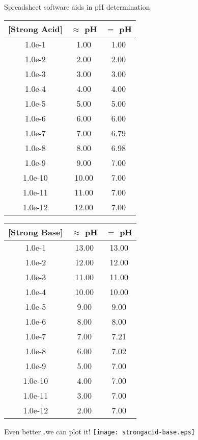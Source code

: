 \documentclass[11pt,letterpaper]{article}
\begin{document}
\begin{frame}{Spreadsheet software aids in pH determination}
	\begin{center}
		\begin{tabular} {S[table-format=1.1e-2] *{2}{S[table-format=2.2]}}
			{[Strong Acid]} & {$\approx$ pH} & {$=$ pH} \\ \midrule
			1.0e-1 & 1.00 & 1.00 \\
			1.0e-2 & 2.00 & 2.00 \\
			1.0e-3 & 3.00 & 3.00 \\
			1.0e-4 & 4.00 & 4.00 \\
			1.0e-5 & 5.00 & 5.00 \\
			1.0e-6 & 6.00 & 6.00 \\
			1.0e-7 & 7.00 & 6.79 \\
			1.0e-8 & 8.00 & 6.98 \\
			1.0e-9 & 9.00 & 7.00 \\
			1.0e-10 & 10.00 & 7.00 \\
			1.0e-11 & 11.00 & 7.00 \\
			1.0e-12 & 12.00 & 7.00
		\end{tabular}
		\qquad
		\begin{tabular} {S[table-format=1.1e-2] *{2}{S[table-format=2.2]}}
			{[Strong Base]} & {$\approx$ pH} & {$=$ pH} \\ \midrule
			1.0e-1 & 13.00 & 13.00 \\
			1.0e-2 & 12.00 & 12.00 \\
			1.0e-3 & 11.00 & 11.00 \\
			1.0e-4 & 10.00 & 10.00 \\
			1.0e-5 & 9.00 & 9.00 \\
			1.0e-6 & 8.00 & 8.00 \\
			1.0e-7 & 7.00 & 7.21 \\
			1.0e-8 & 6.00 & 7.02 \\
			1.0e-9 & 5.00 & 7.00 \\
			1.0e-10 & 4.00 & 7.00 \\
			1.0e-11 & 3.00 & 7.00 \\
			1.0e-12 & 2.00 & 7.00
		\end{tabular}
	\end{center}
\end{frame}


\begin{frame}{Even better\ldots we can plot it!}
	\centering
	\texttt{[image: strongacid-base.eps]}
\end{frame}
\end{document}
